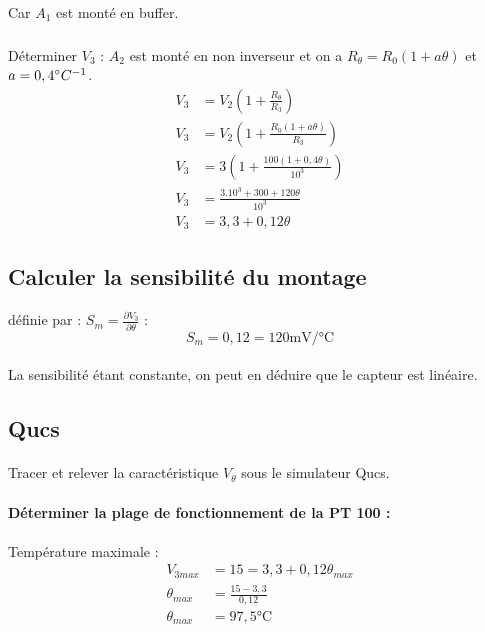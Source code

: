 \documentclass{article}
\begin{document}
\paragraph{}
Car $A_1$ est monté en buffer.

\subparagraph{}
Déterminer $V_3$ :
$A_2$ est monté en non inverseur et on a $R_\theta = R_0\left(1 + a\theta \right)$ et $a = 0,4\degree C^{-1}$.
\begin{align*}
    V_3 & = V_2\left(1 + \frac{R_\theta}{R_3}\right)                      \\
    V_3 & = V_2\left(1 + \frac{R_0\left(1 + a\theta \right)}{R_3}\right)  \\
    V_3 & = 3\left(1 + \frac{100\left(1 + 0,4\theta \right)}{10^3}\right) \\
    V_3 & = \frac{3.10^3 + 300 + 120\theta}{10^3}                         \\
    V_3 & = 3,3 + 0,12\theta
\end{align*}

\subsection{Calculer la sensibilité du montage}
\paragraph{}
définie par : $S_m = \frac{\partial V_3}{\partial\theta}$ : $$S_m = 0,12 = 120 \si{\milli\volt/\celsius}$$

\paragraph{}
La sensibilité étant constante, on peut en déduire que le capteur est linéaire.

\subsection{Qucs}
\paragraph{}
Tracer et relever la caractéristique $V_\theta$ sous le simulateur Qucs.

\paragraph{Déterminer la plage de fonctionnement de la PT 100 :}

\paragraph{}
Température maximale :
\begin{align*}
    V_{3 max}    & = 15 = 3,3 + 0,12\theta_{max} \\
    \theta_{max} & = \frac{15 - 3,3}{0,12}       \\
    \theta_{max} & = 97,5\si{\celsius}
\end{align*}
\end{document}
